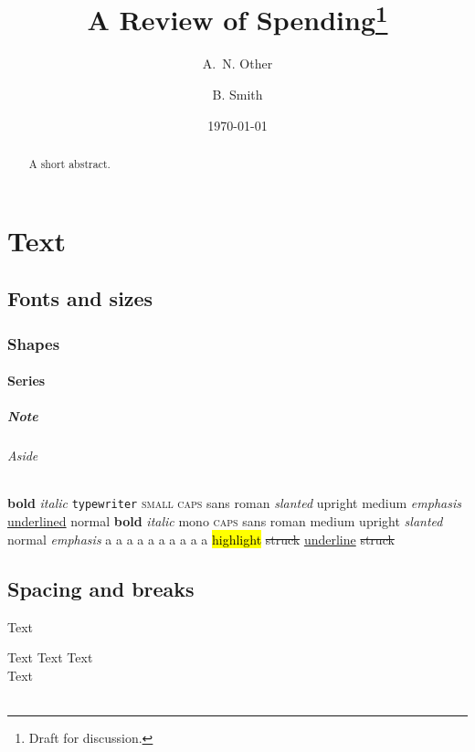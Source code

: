 \documentclass[11pt,a4paper]{report}
\title{A Review of Spending\thanks{Draft for discussion.}}
\author{A.~N. Other \and B. Smith}
\date{\today}
\theoremstyle{definition}
\begin{document}
\maketitle
\tableofcontents
\listoffigures
\listoftables

\begin{abstract}
A short abstract.
\end{abstract}

\chapter{Text}
\section{Fonts and sizes}\label{sec:fonts}
\subsection{Shapes}
\subsubsection{Series}
\paragraph{Note} \subparagraph{Aside}
\textbf{bold} \textit{italic} \texttt{typewriter} \textsc{small caps}
\textsf{sans} \textrm{roman} \textsl{slanted} \textup{upright} \textmd{medium}
\emph{emphasis} \underline{underlined} \textnormal{normal}
{\bfseries bold} {\itshape italic} {\ttfamily mono} {\scshape caps}
{\sffamily sans} {\rmfamily roman} {\mdseries medium} {\upshape upright}
{\slshape slanted} {\normalfont normal} {\em emphasis}
{\tiny a} {\scriptsize a} {\footnotesize a} {\small a} {\normalsize a}
{\large a} {\Large a} {\LARGE a} {\huge a} {\Huge a}
\hl{highlight} \st{struck} \ul{underline} \sout{struck} 

\section{Spacing and breaks}
\noindent Text\par
\indent Text \newline Text \linebreak Text \\ Text \\[2pt]
\smallskip \medskip \bigskip \vfill \hfill \hspace{1em} \vspace{2mm}
\hspace*{1cm} \vspace*{1cm} \quad \qquad \enspace \thinspace \,\;\!\
\centering \raggedright \raggedleft
\newpage \clearpage \cleardoublepage \pagebreak \nopagebreak
\singlespacing \onehalfspacing \doublespacing
\end{document}
